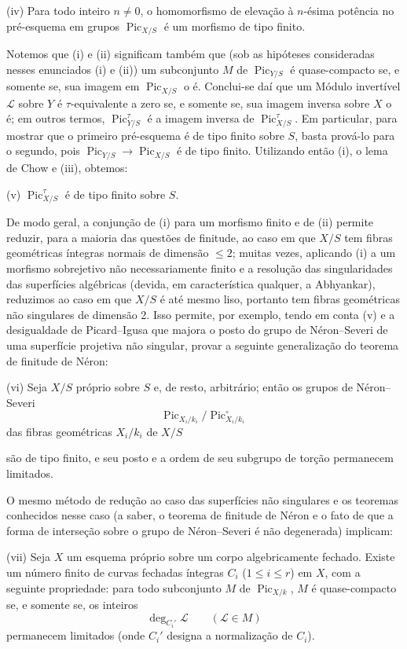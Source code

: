 \documentclass[11pt,twoside,openany]{book}
\numberwithin{equation}{section}
\newcommand{\src}[1]{%
  \phantomsection\hypertarget{src:#1}{}%
  \marginpar{\raggedleft\footnotesize\sffamily #1}%
}
\theoremstyle{plain}
\theoremstyle{definition}
\theoremstyle{remark}
\newcommand{\FgaUnitKey}{frontmatter}
\renewcommand{\src}[1]{%
  \phantomsection\hypertarget{src:\FgaUnitKey:#1}{}%
  \marginpar{\raggedleft\footnotesize\sffamily #1}%
}
\begin{document}
\noindent(iv) Para todo inteiro $n\neq0$, o homomorfismo de elevação à
$n$-ésima potência no pré-esquema em grupos $\operatorname{Pic}_{X/S}$ é um
morfismo de tipo finito.

Notemos que (i) e (ii) significam também que (sob as hipóteses consideradas
nesses enunciados (i) e (ii)) um subconjunto $M$ de
$\operatorname{Pic}_{Y/S}$ é quase-compacto se, e somente se, sua imagem em
$\operatorname{Pic}_{X/S}$ o é. Conclui-se daí que um Módulo invertível
$\mathcal L$ sobre $Y$ é $\tau$-equivalente a zero se, e somente se, sua imagem
inversa sobre $X$ o é; em outros termos, $\operatorname{Pic}_{Y/S}^\tau$ é a
imagem inversa de $\operatorname{Pic}_{X/S}^\tau$. Em particular, para mostrar
que o primeiro pré-esquema é de tipo finito sobre $S$, basta prová-lo para o
segundo, pois $\operatorname{Pic}_{Y/S}\longrightarrow
\operatorname{Pic}_{X/S}$ é de tipo finito. Utilizando então (i), o lema de
Chow e (iii), obtemos:

\medskip
\noindent(v) $\operatorname{Pic}_{X/S}^\tau$ é de tipo finito sobre $S$.

De modo geral, a conjunção de (i) para um morfismo finito e de (ii) permite
reduzir, para a maioria das questões de finitude, ao caso em que $X/S$ tem
fibras geométricas íntegras normais de dimensão $\leq2$; muitas vezes, aplicando
(i) a um morfismo sobrejetivo não necessariamente finito e a resolução das
singularidades das superfícies algébricas (devida, em característica qualquer,
a Abhyankar), reduzimos ao caso em que $X/S$ é até mesmo liso, portanto tem
fibras geométricas não singulares de dimensão 2. Isso permite, por exemplo,
tendo em conta (v) e a desigualdade de Picard--Igusa que majora o posto do grupo
de Néron--Severi de uma superfície projetiva não singular, provar a seguinte
generalização do teorema de finitude de Néron:

\medskip
\noindent(vi) Seja $X/S$ próprio sobre $S$ e, de resto, arbitrário; então os
grupos de Néron--Severi
\[
\operatorname{Pic}_{X_i/k_i}/\operatorname{Pic}_{X_i/k_i}^\circ
\]
das fibras geométricas $X_i/k_i$ de $X/S$
\src{305}
são de tipo finito, e seu posto e a ordem de seu subgrupo de torção permanecem
limitados.

O mesmo método de redução ao caso das superfícies não singulares e os teoremas
conhecidos nesse caso (a saber, o teorema de finitude de Néron e o fato de que a
forma de interseção sobre o grupo de Néron--Severi é não degenerada) implicam:

\medskip
\noindent(vii) Seja $X$ um esquema próprio sobre um corpo algebricamente
fechado. Existe um número finito de curvas fechadas íntegras $C_i$
($1\leq i\leq r$) em $X$, com a seguinte propriedade: para todo subconjunto
$M$ de $\operatorname{Pic}_{X/k}$, $M$ é quase-compacto se, e somente se, os
inteiros
\[
\deg_{C_i'}\mathcal L\qquad(\mathcal L\in M)
\]
permanecem limitados (onde $C_i'$ designa a normalização de $C_i$).
\end{document}
